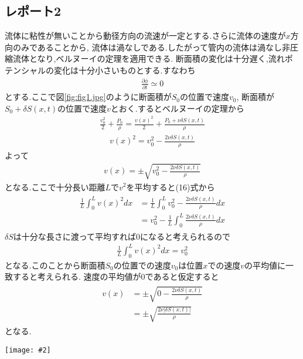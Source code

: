 \documentclass[uplatex,a4j,11pt,dvipdfmx]{jsarticle}
\makeatletter
\def\fgcaption{\def\@captype{figure}\caption}
\newcommand{\mfig}[3][width=15cm]{
\begin{center}
\texttt{[image: \#2]}
\fgcaption{#3 \label{fig:#2}}
\end{center}
}
\makeatother
\begin{document}
\subsection*{レポート2}
流体に粘性が無いことから動径方向の流速が一定とする.さらに流体の速度が$x$方向のみであることから,
流体は渦なしである.したがって管内の流体は渦なし非圧縮流体となり,ベルヌーイの定理を適用できる.
断面積の変化は十分遅く,流れポテンシャルの変化は十分小さいものとする.すなわち
\begin{align}
  \frac{\partial \phi}{\partial t}\simeq0
\end{align}
とする.ここで図\ref{fig:fig1.jpg}のように断面積が$S_0$の位置で速度$v_0$,
断面積が$S_0+\delta S(x,t)$の位置で速度$v$とおく.するとベルヌーイの定理から
\begin{align*}
  \frac{v_0^2}{2}+\frac{P_0}{\rho}=\frac{v(x)^2}{2}+\frac{P_0+\nu\delta S(x,t)}{\rho}    
\end{align*}
\begin{align}
  v(x)^2=v_0^2-\frac{2\nu\delta S(x,t)}{\rho}
\end{align}
よって
\begin{align}
  v(x)=\pm\sqrt{v_0^2-\frac{2\nu\delta S(x,t)}{\rho}}
\end{align}
となる.ここで十分長い距離$L$で$v^2$を平均すると(16)式から
\begin{align}
  \begin{split}
    \frac{1}{L}\int_0^Lv(x)^2dx&=\frac{1}{L}\int_0^Lv_0^2-\frac{2\nu\delta S(x,t)}{\rho}dx\\
    &=v_0^2-\frac{1}{L}\int_0^L\frac{2\nu\delta S(x,t)}{\rho}dx
  \end{split}
\end{align}
$\delta S$は十分な長さに渡って平均すれば0になると考えられるので
\begin{align}
  \frac{1}{L}\int_0^Lv(x)^2dx=v_0^2
\end{align}
となる.このことから断面積$S_0$の位置での速度$v_0$は位置$x$での速度$v$の平均値に一致すると考えられる.
速度の平均値が0であると仮定すると
\begin{align}
  \begin{split}
    v(x)&=\pm\sqrt{0-\frac{2\nu\delta S(x,t)}{\rho}}\\
    &=\pm\sqrt{\frac{2\nu|\delta S(x,t)|}{\rho}}
  \end{split}
\end{align}
となる.
\mfig[width=8cm]{fig1.jpg}{断面積の変化}
\end{document}
